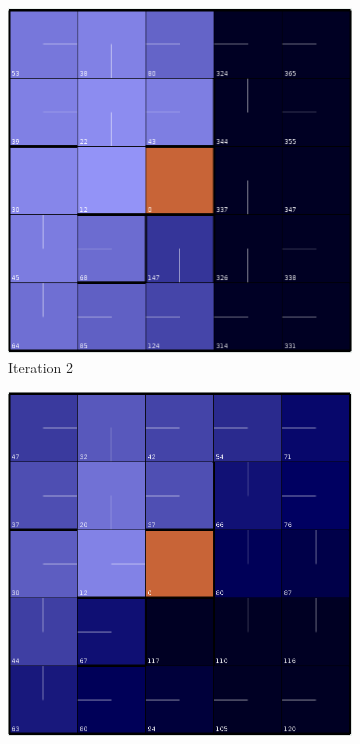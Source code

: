 \documentclass[letterpaper]{article}
\begin{document}
	\begin{figure}
		\centering
		\begin{subfigure}{.3\textwidth}
			\centering
			\includegraphics[width=\linewidth]{images/small_pi_2}
			\caption{Iteration 2}
		\end{subfigure}
		\begin{subfigure}{.3\textwidth}
			\centering
			\includegraphics[width=\linewidth]{images/small_pi_4}

\end{subfigure}
\end{figure}
\end{document}
